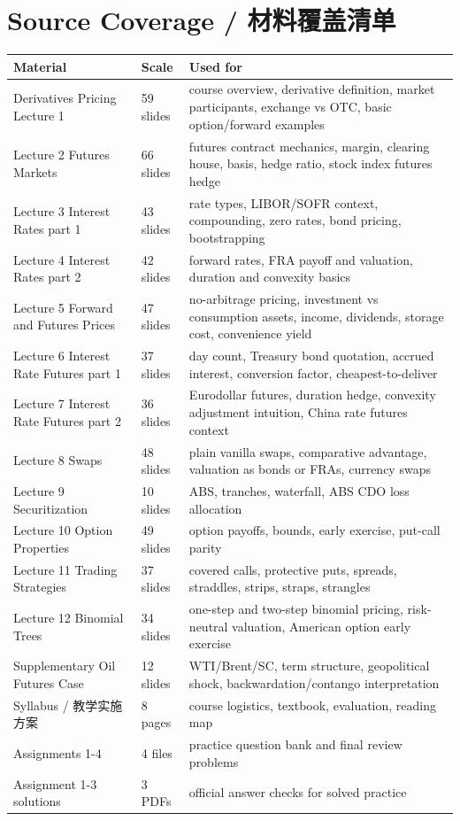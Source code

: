 \documentclass[11pt,a4paper,openany]{ctexbook}
\begin{document}
\chapter*{Source Coverage / 材料覆盖清单}

\begin{longtable}{p{}p{}p{}}
\toprule
\textbf{Material} & \textbf{Scale} & \textbf{Used for} \\
\midrule
Derivatives Pricing Lecture 1 & 59 slides & course overview, derivative definition, market participants, exchange vs OTC, basic option/forward examples \\
Lecture 2 Futures Markets & 66 slides & futures contract mechanics, margin, clearing house, basis, hedge ratio, stock index futures hedge \\
Lecture 3 Interest Rates part 1 & 43 slides & rate types, LIBOR/SOFR context, compounding, zero rates, bond pricing, bootstrapping \\
Lecture 4 Interest Rates part 2 & 42 slides & forward rates, FRA payoff and valuation, duration and convexity basics \\
Lecture 5 Forward and Futures Prices & 47 slides & no-arbitrage pricing, investment vs consumption assets, income, dividends, storage cost, convenience yield \\
Lecture 6 Interest Rate Futures part 1 & 37 slides & day count, Treasury bond quotation, accrued interest, conversion factor, cheapest-to-deliver \\
Lecture 7 Interest Rate Futures part 2 & 36 slides & Eurodollar futures, duration hedge, convexity adjustment intuition, China rate futures context \\
Lecture 8 Swaps & 48 slides & plain vanilla swaps, comparative advantage, valuation as bonds or FRAs, currency swaps \\
Lecture 9 Securitization & 10 slides & ABS, tranches, waterfall, ABS CDO loss allocation \\
Lecture 10 Option Properties & 49 slides & option payoffs, bounds, early exercise, put-call parity \\
Lecture 11 Trading Strategies & 37 slides & covered calls, protective puts, spreads, straddles, strips, straps, strangles \\
Lecture 12 Binomial Trees & 34 slides & one-step and two-step binomial pricing, risk-neutral valuation, American option early exercise \\
Supplementary Oil Futures Case & 12 slides & WTI/Brent/SC, term structure, geopolitical shock, backwardation/contango interpretation \\
Syllabus / 教学实施方案 & 8 pages & course logistics, textbook, evaluation, reading map \\
Assignments 1-4 & 4 files & practice question bank and final review problems \\
Assignment 1-3 solutions & 3 PDFs & official answer checks for solved practice \\
\bottomrule
\end{longtable}
\end{document}
